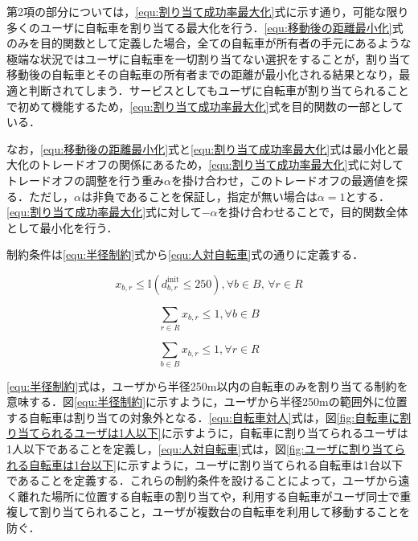       \par 第2項の部分については，\ref{equ:割り当て成功率最大化}式に示す通り，可能な限り多くのユーザに自転車を割り当てる最大化を行う．\ref{equ:移動後の距離最小化}式のみを目的関数として定義した場合，全ての自転車が所有者の手元にあるような極端な状況ではユーザに自転車を一切割り当てない選択をすることが，割り当て移動後の自転車とその自転車の所有者までの距離が最小化される結果となり，最適と判断されてしまう．サービスとしてもユーザに自転車が割り当てられることで初めて機能するため，\ref{equ:割り当て成功率最大化}式を目的関数の一部としている．
      
      \par なお，\ref{equ:移動後の距離最小化}式と\ref{equ:割り当て成功率最大化}式は最小化と最大化のトレードオフの関係にあるため，\ref{equ:割り当て成功率最大化}式に対してトレードオフの調整を行う重み$\alpha$を掛け合わせ，このトレードオフの最適値を探る．ただし，$\alpha$は非負であることを保証し，指定が無い場合は$\alpha=1$とする．\ref{equ:割り当て成功率最大化}式に対して$-\alpha$を掛け合わせることで，目的関数全体として最小化を行う．
      
      \par 制約条件は\ref{equ:半径制約}式から\ref{equ:人対自転車}式の通りに定義する．
      
      \begin{equation}\label{equ:半径制約}
        x_{b, r} \leq \mathbb{I}(d^{\text{init}}_{b, r} \leq 250), \forall b \in B, \, \forall r \in R
      \end{equation}
      
      \begin{equation}\label{equ:自転車対人}
        \sum_{r \in R}x_{b,r} \leq 1, \forall b \in B
      \end{equation}
      
      \begin{equation}\label{equ:人対自転車}
        \sum_{b \in B}x_{b,r} \leq 1, \forall r \in R
      \end{equation}
      
      \par \ref{equ:半径制約}式は，ユーザから半径250m以内の自転車のみを割り当てる制約を意味する．図\ref{equ:半径制約}に示すように，ユーザから半径250mの範囲外に位置する自転車は割り当ての対象外となる．\ref{equ:自転車対人}式は，図\ref{fig:自転車に割り当てられるユーザは1人以下}に示すように，自転車に割り当てられるユーザは1人以下であることを定義し，\ref{equ:人対自転車}式は，図\ref{fig:ユーザに割り当てられる自転車は1台以下}に示すように，ユーザに割り当てられる自転車は1台以下であることを定義する．これらの制約条件を設けることによって，ユーザから遠く離れた場所に位置する自転車の割り当てや，利用する自転車がユーザ同士で重複して割り当てられること，ユーザが複数台の自転車を利用して移動することを防ぐ．
      
